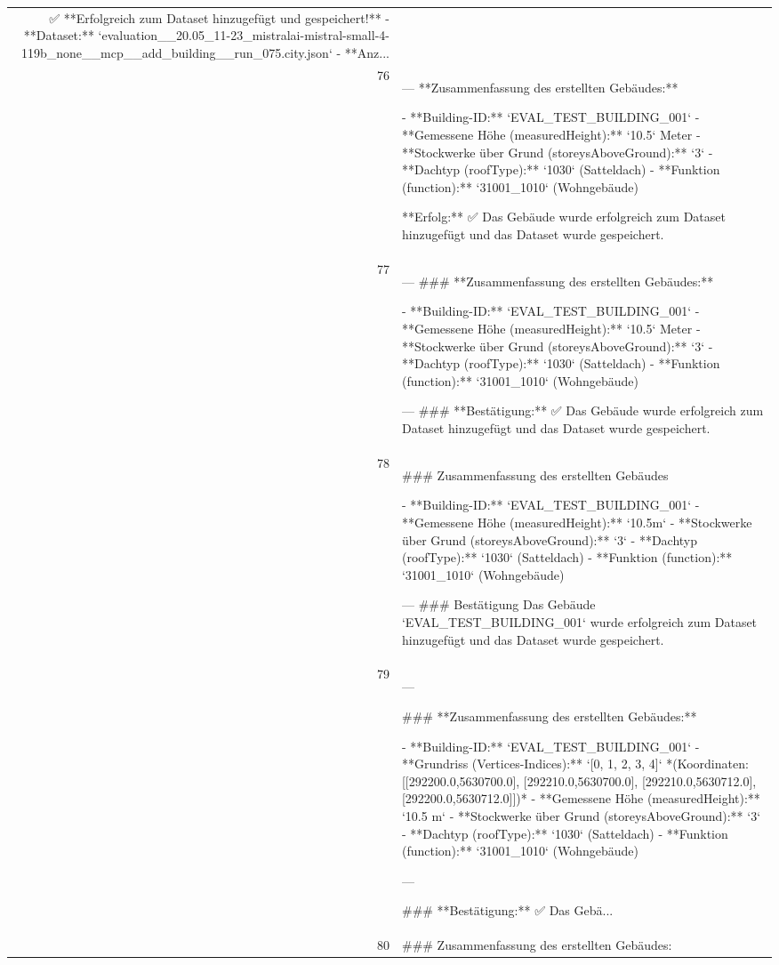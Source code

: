 \documentclass[a4paper,11pt]{article}
\begin{document}
\begin{table}[ht]
\begin{tabular}{r p{12cm}}
✅ **Erfolgreich zum Dataset hinzugefügt und gespeichert!**
- **Dataset:** `evaluation\_\_20.05\_11-23\_mistralai-mistral-small-4-119b\_none\_\_mcp\_\_add\_building\_\_run\_075.city.json`
- **Anz... \\
76 & ---
**Zusammenfassung des erstellten Gebäudes:**

- **Building-ID:** `EVAL\_TEST\_BUILDING\_001`
- **Gemessene Höhe (measuredHeight):** `10.5` Meter
- **Stockwerke über Grund (storeysAboveGround):** `3`
- **Dachtyp (roofType):** `1030` (Satteldach)
- **Funktion (function):** `31001\_1010` (Wohngebäude)

**Erfolg:**
✅ Das Gebäude wurde erfolgreich zum Dataset hinzugefügt und das Dataset wurde gespeichert. \\
77 & ---
\#\#\# **Zusammenfassung des erstellten Gebäudes:**

- **Building-ID:** `EVAL\_TEST\_BUILDING\_001`
- **Gemessene Höhe (measuredHeight):** `10.5` Meter
- **Stockwerke über Grund (storeysAboveGround):** `3`
- **Dachtyp (roofType):** `1030` (Satteldach)
- **Funktion (function):** `31001\_1010` (Wohngebäude)

---
\#\#\# **Bestätigung:**
✅ Das Gebäude wurde erfolgreich zum Dataset hinzugefügt und das Dataset wurde gespeichert. \\
78 & \#\#\# Zusammenfassung des erstellten Gebäudes

- **Building-ID:** `EVAL\_TEST\_BUILDING\_001`
- **Gemessene Höhe (measuredHeight):** `10.5m`
- **Stockwerke über Grund (storeysAboveGround):** `3`
- **Dachtyp (roofType):** `1030` (Satteldach)
- **Funktion (function):** `31001\_1010` (Wohngebäude)

---
\#\#\# Bestätigung
Das Gebäude `EVAL\_TEST\_BUILDING\_001` wurde erfolgreich zum Dataset hinzugefügt und das Dataset wurde gespeichert. \\
79 & ---

\#\#\# **Zusammenfassung des erstellten Gebäudes:**

- **Building-ID:** `EVAL\_TEST\_BUILDING\_001`
- **Grundriss (Vertices-Indices):** `[0, 1, 2, 3, 4]`
  *(Koordinaten: [[292200.0,5630700.0], [292210.0,5630700.0], [292210.0,5630712.0], [292200.0,5630712.0]])*
- **Gemessene Höhe (measuredHeight):** `10.5 m`
- **Stockwerke über Grund (storeysAboveGround):** `3`
- **Dachtyp (roofType):** `1030` (Satteldach)
- **Funktion (function):** `31001\_1010` (Wohngebäude)

---

\#\#\# **Bestätigung:**
✅ Das Gebä... \\
80 & \#\#\# Zusammenfassung des erstellten Gebäudes:


\end{tabular}
\end{table}
\end{document}
